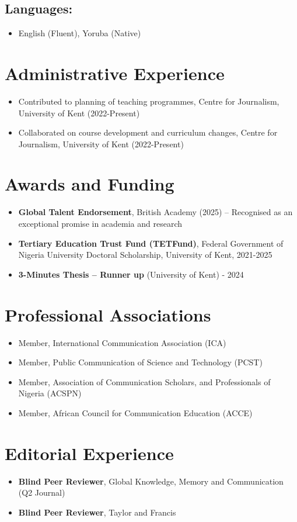 \documentclass[a4paper,11pt]{article}
\newcommand{\resumeItem}[1]{
  \item\small{
    {#1 \vspace{-2pt}}
  }
}
\newcommand{\resumeItemListStart}{\begin{itemize}}
\newcommand{\resumeItemListEnd}{\end{itemize}\vspace{-5pt}}
\begin{document}
\subsection{Languages:}
    \resumeItemListStart
        \resumeItem{English (Fluent), Yoruba (Native)}
    \resumeItemListEnd

\section{Administrative Experience}
    \resumeItemListStart
        \resumeItem{Contributed to planning of teaching programmes, Centre for Journalism, University of Kent (2022-Present)}
        \resumeItem{Collaborated on course development and curriculum changes, Centre for Journalism, University of Kent (2022-Present)}
    \resumeItemListEnd

\section{Awards and Funding}
    \resumeItemListStart
        \resumeItem{\textbf{Global Talent Endorsement}, British Academy (2025) -- Recognised as an exceptional promise in academia and research}
        \resumeItem{\textbf{Tertiary Education Trust Fund (TETFund)}, Federal Government of Nigeria University Doctoral Scholarship, University of Kent, 2021-2025}
        \resumeItem{\textbf{3-Minutes Thesis -- Runner up} (University of Kent) - 2024}
    \resumeItemListEnd

\section{Professional Associations}
    \resumeItemListStart
        \resumeItem{Member, International Communication Association (ICA)}
        \resumeItem{Member, Public Communication of Science and Technology (PCST)}
        \resumeItem{Member, Association of Communication Scholars, and Professionals of Nigeria (ACSPN)}
        \resumeItem{Member, African Council for Communication Education (ACCE)}
    \resumeItemListEnd

\section{Editorial Experience}
    \resumeItemListStart
        \resumeItem{\textbf{Blind Peer Reviewer}, Global Knowledge, Memory and Communication (Q2 Journal)}
        \resumeItem{\textbf{Blind Peer Reviewer}, Taylor and Francis}
    \resumeItemListEnd
\end{document}
